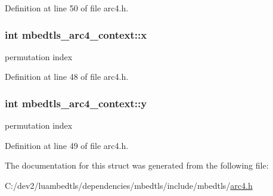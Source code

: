 Definition at line 50 of file arc4.\-h.

\hypertarget{structmbedtls__arc4__context_a35ada04bd0e0ebb3c91fe0a7be91d62c}{
\subsubsection[{x}]{\setlength{\rightskip}{0pt plus 5cm}int mbedtls\-\_\-arc4\-\_\-context\-::x}}\label{structmbedtls__arc4__context_a35ada04bd0e0ebb3c91fe0a7be91d62c}
permutation index 

Definition at line 48 of file arc4.\-h.

\hypertarget{structmbedtls__arc4__context_a53d6a6d70c2b3ef5cd4467ae32e21429}{
\subsubsection[{y}]{\setlength{\rightskip}{0pt plus 5cm}int mbedtls\-\_\-arc4\-\_\-context\-::y}}\label{structmbedtls__arc4__context_a53d6a6d70c2b3ef5cd4467ae32e21429}
permutation index 

Definition at line 49 of file arc4.\-h.



The documentation for this struct was generated from the following file\-:\begin{DoxyCompactItemize}
\item 
C\-:/dev2/luambedtls/dependencies/mbedtls/include/mbedtls/\hyperlink{arc4_8h}{arc4.\-h}\end{DoxyCompactItemize}
